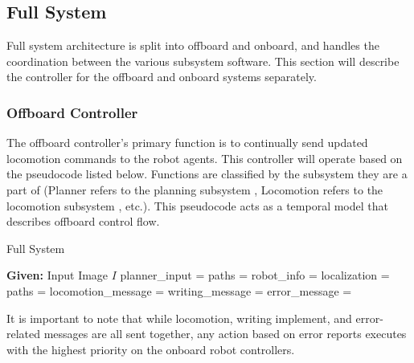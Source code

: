
\subsection{Full System}
\label{sec:software_full_system}

Full system architecture is split into offboard and onboard, and handles the coordination between the various subsystem software. This section will describe the controller for the offboard and onboard systems separately.

\subsubsection{Offboard Controller}
\label{sec:software_full_offboard}
The offboard controller's primary function is to continually send updated locomotion commands to the robot agents. This controller will operate based on the pseudocode listed below. Functions are classified by the subsystem they are a part of (Planner refers to the planning subsystem , Locomotion refers to the locomotion subsystem , etc.). This pseudocode acts as a temporal model that describes offboard control flow.

\begin{algorithm}[t!]
\caption{Full System}\label{algo:full_system}
\begin{algorithmic}[1]
\State \textbf{Given:} Input Image $I$
\State planner\_input = 
\State paths = 
\State {}
    \State robot\_info = 
    \State localization = 
   \State paths = 
   \State locomotion\_message = 
   \State writing\_message = 
   \State error\_message = 
   \State {}
   \State {}
\EndProcedure
\end{algorithmic}
\end{algorithm}

It is important to note that while locomotion, writing implement, and error-related messages are all sent together, any action based on error reports executes with the highest priority on the onboard robot controllers.

